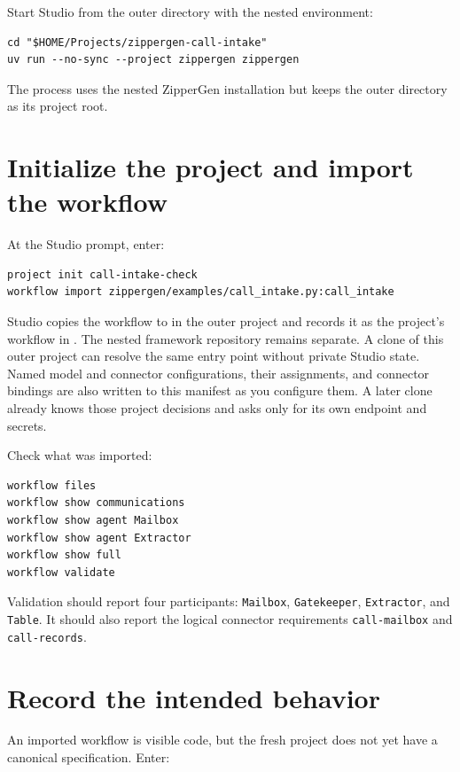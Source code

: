 \documentclass[11pt,a4paper]{article}
\begin{document}
Start Studio from the outer directory with the nested environment:

\begin{lstlisting}[style=shell]
cd "$HOME/Projects/zippergen-call-intake"
uv run --no-sync --project zippergen zippergen
\end{lstlisting}

The process uses the nested ZipperGen installation but keeps the outer
directory as its project root.

\section{Initialize the project and import the workflow}

At the Studio prompt, enter:

\begin{lstlisting}[style=shell]
project init call-intake-check
workflow import zippergen/examples/call_intake.py:call_intake
\end{lstlisting}

Studio copies the workflow to  in the outer
project and records it as the project's workflow in .
The nested framework repository remains separate. A clone of this outer
project can resolve the same entry point without private Studio state. Named
model and connector configurations, their assignments, and connector bindings
are also written to this manifest as you configure them. A later clone already
knows those project decisions and asks only for its own endpoint and secrets.

Check what was imported:

\begin{lstlisting}[style=shell]
workflow files
workflow show communications
workflow show agent Mailbox
workflow show agent Extractor
workflow show full
workflow validate
\end{lstlisting}

Validation should report four participants:
\texttt{Mailbox}, \texttt{Gatekeeper}, \texttt{Extractor}, and
\texttt{Table}. It should also report the logical connector requirements
\texttt{call-mailbox} and \texttt{call-records}.

\section{Record the intended behavior}

An imported workflow is visible code, but the fresh project does not yet have
a canonical specification. Enter:
\end{document}
